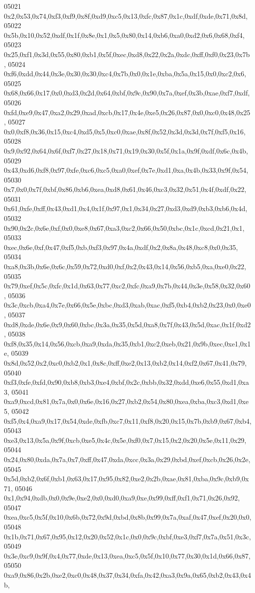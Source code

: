 \begin{DoxyCode}
05021   0x2,0x53,0x74,0xf3,0xf9,0x8f,0xd9,0xc5,0x13,0xfc,0x87,0x1c,0xdf,0xde,0x71,0x8d,
05022   0x5b,0x10,0x52,0xdf,0x1f,0x8e,0x1,0x5,0x80,0x14,0xb6,0xa0,0xd2,0x6,0x68,0xf4,
05023   0x25,0xf1,0x3d,0x55,0x80,0xb1,0x5f,0xec,0xd8,0x22,0x2a,0xdc,0xff,0xf0,0x23,0x7b,
05024   0xf6,0xdd,0x44,0x3e,0x30,0x30,0xc4,0x7b,0x0,0x1e,0xba,0x5a,0x15,0x0,0xc2,0x6,
05025   0x68,0x66,0x17,0x0,0xd3,0x2d,0x64,0xbf,0x9c,0x90,0x7a,0xef,0x3b,0xae,0xf7,0xdf,
05026   0xfd,0xe9,0x47,0xa2,0x29,0xad,0xcb,0x17,0x4e,0xe5,0x26,0x87,0x0,0xc0,0x48,0x25,
05027   0x0,0xf8,0x36,0x15,0xc4,0xd5,0x5,0xc0,0xae,0x8f,0x52,0x3d,0x3d,0x7f,0xf5,0x16,
05028   0x9,0x92,0x64,0x6f,0xf7,0x27,0x18,0x71,0x19,0x30,0x5f,0x1a,0x9f,0xdf,0x6c,0x4b,
05029   0x43,0xd6,0xf8,0x97,0xfe,0xc6,0xc5,0xa0,0xef,0x7e,0xd1,0xa,0x4b,0x33,0x9f,0x54,
05030   0x7,0x0,0x7f,0xbf,0x86,0xb6,0xea,0xd8,0x61,0x46,0xc3,0x32,0x51,0x4f,0xdf,0x22,
05031   0x61,0xfe,0xff,0x43,0xd1,0x4,0x1f,0x97,0x1,0x34,0x27,0xd3,0xd9,0xb3,0xb6,0x4d,
05032   0x90,0x2c,0x6e,0xf,0x0,0xe8,0x67,0xa3,0xc2,0x66,0x50,0xbc,0x1c,0xcd,0x21,0x1,
05033   0xec,0x6e,0xf,0x47,0xf5,0xb,0xf3,0x97,0x4a,0xdf,0x2,0x8a,0x48,0xc8,0x0,0x35,
05034   0xa8,0x3b,0x6e,0x6c,0x59,0x72,0xd0,0xf,0x2,0x43,0x14,0x56,0xb5,0xa,0xe0,0x22,
05035   0x79,0xef,0x5c,0xfc,0x1d,0x63,0x77,0xc2,0xfc,0xa9,0x7b,0x44,0x3e,0x58,0x32,0x60,
05036   0x3c,0xcb,0xa4,0x7e,0x66,0x5e,0xbc,0xd3,0xab,0xac,0xf5,0xb4,0xb2,0x23,0x0,0xe0,
05037   0xd8,0xde,0x6e,0x9,0x60,0xbc,0x3a,0x35,0x5d,0xa8,0x7f,0x43,0x5d,0xac,0x1f,0xd2,
05038   0xf8,0x35,0x14,0x56,0xcb,0xa9,0xda,0x35,0xb1,0xc2,0xeb,0x21,0x9b,0xec,0xe1,0x1e,
05039   0x8d,0x52,0x2,0xc0,0xb2,0x1,0x8c,0xff,0xe2,0x13,0xb2,0x14,0xf2,0x67,0x41,0x79,
05040   0xf3,0xfe,0xfd,0x90,0xb8,0xb3,0xe4,0xbf,0x2c,0xbb,0x32,0xdd,0xe6,0x55,0xd1,0xa3,
05041   0xa9,0xcd,0x81,0x7a,0x0,0x6e,0x16,0x27,0xb2,0x54,0x80,0xea,0xba,0xc3,0xd1,0xe5,
05042   0xf5,0x4,0xa9,0x17,0x54,0xde,0xfb,0xc7,0x11,0xf8,0x20,0x15,0x7b,0xb9,0x67,0xb4,
05043   0xe3,0x13,0x5a,0x9f,0xcb,0xe5,0x4c,0x5e,0xf0,0x7,0x15,0x2,0x20,0x5e,0x11,0x29,
05044   0x24,0x80,0xda,0x7a,0x7,0xff,0x47,0xda,0xcc,0x3a,0x29,0xbd,0xef,0xcb,0x26,0x2e,
05045   0x5d,0xb2,0x6f,0xb1,0x63,0x17,0x95,0x82,0xe2,0x2b,0xae,0x81,0xba,0x9c,0xb9,0x71,
05046   0x1,0x94,0xdb,0x0,0x9e,0xe2,0x0,0xd0,0xa9,0xe,0x99,0xff,0xf1,0x71,0x26,0x92,
05047   0xea,0xc5,0x5f,0x10,0x6b,0x72,0x9d,0xbd,0x8b,0x99,0x7a,0xaf,0x47,0xef,0x20,0x0,
05048   0x1b,0x71,0x67,0x95,0x12,0x20,0x52,0x1c,0x0,0x9c,0xbf,0xe3,0xf7,0x7a,0x51,0x3c,
05049   0x3e,0xc9,0x9f,0x4,0x77,0xde,0x13,0xea,0xc5,0x5f,0x10,0x77,0x30,0x1d,0x66,0x87,
05050   0xa9,0x86,0x2b,0xe2,0xc0,0x48,0x37,0x34,0xfa,0x42,0xa3,0x9a,0x65,0xb2,0x43,0x4b,

\end{DoxyCode}

